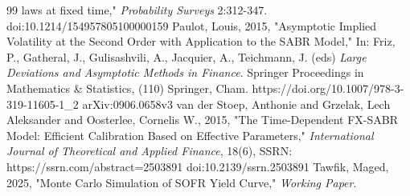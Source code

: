 \documentclass[12pt,oneside]{article}
\numberwithin{equation}{section}
\begin{document}
\begin{thebibliography}{99}
        laws at fixed time," {\em Probability Surveys} 2:312-347.
        doi:10.1214/154957805100000159 
        Paulot, Louis, 2015, "Asymptotic Implied Volatility at the Second Order with
        Application to the SABR Model," In: Friz, P., Gatheral, J., Gulisashvili,
        A., Jacquier, A., Teichmann, J. (eds) {\em
        Large Deviations and Asymptotic Methods in Finance}.
        Springer Proceedings in Mathematics \& Statistics, (110)
        Springer, Cham. https://doi.org/10.1007/978-3-319-11605-1\_2
        arXiv:0906.0658v3
        van der Stoep, Anthonie and Grzelak, Lech Aleksander and
        Oosterlee, Cornelis W., 2015, "The Time-Dependent FX-SABR Model:
        Efficient Calibration Based on Effective Parameters,"
        {\em International Journal of Theoretical and Applied Finance}, 18(6),
        SSRN: https://ssrn.com/abstract=2503891 
        doi:10.2139/ssrn.2503891
         Tawfik, Maged, 2025, "Monte Carlo Simulation of SOFR Yield Curve," {\em Working Paper}.
\end{thebibliography}
\end{document}
